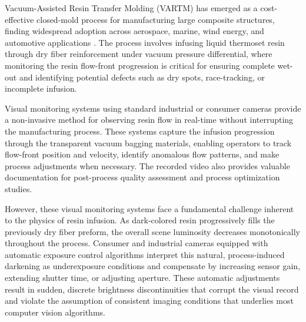 \documentclass[conference]{IEEEtran}
\begin{document}
Vacuum-Assisted Resin Transfer Molding (VARTM) has emerged as a cost-effective closed-mold process for manufacturing large composite structures, finding widespread adoption across aerospace, marine, wind energy, and automotive applications \cite{vartm_review}. The process involves infusing liquid thermoset resin through dry fiber reinforcement under vacuum pressure differential, where monitoring the resin flow-front progression is critical for ensuring complete wet-out and identifying potential defects such as dry spots, race-tracking, or incomplete infusion.

Visual monitoring systems using standard industrial or consumer cameras provide a non-invasive method for observing resin flow in real-time without interrupting the manufacturing process. These systems capture the infusion progression through the transparent vacuum bagging materials, enabling operators to track flow-front position and velocity, identify anomalous flow patterns, and make process adjustments when necessary. The recorded video also provides valuable documentation for post-process quality assessment and process optimization studies.

However, these visual monitoring systems face a fundamental challenge inherent to the physics of resin infusion. As dark-colored resin progressively fills the previously dry fiber preform, the overall scene luminosity decreases monotonically throughout the process. Consumer and industrial cameras equipped with automatic exposure control algorithms interpret this natural, process-induced darkening as underexposure conditions and compensate by increasing sensor gain, extending shutter time, or adjusting aperture. These automatic adjustments result in sudden, discrete brightness discontinuities that corrupt the visual record and violate the assumption of consistent imaging conditions that underlies most computer vision algorithms.
\end{document}
